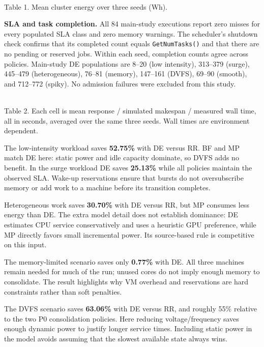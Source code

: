 \documentclass[10pt,letterpaper]{article}
\begin{document}
\begin{center}
\small

\\[4pt]Table 1. Mean cluster energy over three seeds (Wh).
\end{center}

\textbf{SLA and task completion.} All 84 main-study executions report zero misses
for every populated SLA class and zero memory warnings. The scheduler's shutdown
check confirms that its completed count equals \texttt{GetNumTasks()} and that
there are no pending or reserved jobs. Within each seed, completion counts agree
across policies. Main-study DE populations are 8--20 (low intensity), 313--379
(surge), 445--479 (heterogeneous), 76--81 (memory), 147--161 (DVFS), 69--90 (smooth),
and 712--772 (spiky). No admission failures were excluded from this study.

\begin{center}
\scriptsize
\setlength{\tabcolsep}{3pt}
\resizebox{\linewidth}{!}{}
\\[4pt]\small Table 2. Each cell is mean response / simulated makespan / measured wall time,
all in seconds, averaged over the same three seeds. Wall times are environment dependent.
\end{center}

The low-intensity workload saves \textbf{52.75\%} with DE versus RR. BF and MP
match DE here: static power and idle capacity dominate, so DVFS adds no benefit.
In the surge workload DE saves \textbf{25.13\%} while all policies maintain the
observed SLA. Wake-up reservations ensure that bursts do not oversubscribe memory
or add work to a machine before its transition completes.

Heterogeneous work saves \textbf{30.70\%} with DE versus RR, but MP consumes less
energy than DE. The extra model detail does not establish dominance: DE estimates
CPU service conservatively and uses a heuristic GPU preference, while MP directly
favors small incremental power. Its source-based rule is competitive on this input.

The memory-limited scenario saves only \textbf{0.77\%} with DE. All three machines
remain needed for much of the run; unused cores do not imply enough memory to
consolidate. The result highlights why VM overhead and reservations are hard
constraints rather than soft penalties.

The DVFS scenario saves \textbf{63.06\%} with DE versus RR, and roughly 55\%
relative to the two P0 consolidation policies. Here reducing voltage/frequency
saves enough dynamic power to justify longer service times. Including static
power in the model avoids assuming that the slowest available state always wins.
\end{document}
